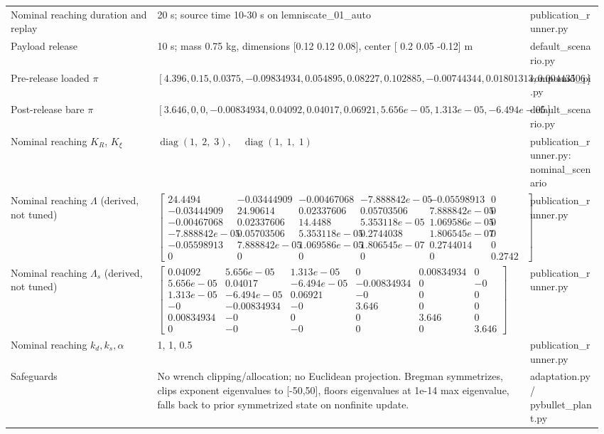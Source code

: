 \begin{table}[t]
\begin{tabular}{p{0.24\linewidth}p{0.61\linewidth}p{0.12\linewidth}}
Nominal reaching duration and replay & 20 s; source time 10-30 s on lemniscate_01_auto & publication_runner.py \\
Payload release & 10 s; mass 0.75 kg, dimensions [0.12 0.12 0.08], center [ 0.2   0.05 -0.12] m & default_scenario.py \\
Pre-release loaded $\pi$ & $[4.396, 0.15, 0.0375, -0.09834934, 0.054895, 0.08227, 0.102885, -0.00744344, 0.01801313, 0.00443506]$ & compound_pi.py \\
Post-release bare $\pi$ & $[3.646, 0, 0, -0.00834934, 0.04092, 0.04017, 0.06921, 5.656e-05, 1.313e-05, -6.494e-05]$ & default_scenario.py \\
Nominal reaching $K_R$, $K_\xi$ & $\operatorname{diag}(1,\;2,\;3),\quad \operatorname{diag}(1,\;1,\;1)$ & publication_runner.py: nominal_scenario \\
Nominal reaching $\Lambda$ (derived, not tuned) & $\begin{bmatrix}24.4494 & -0.03444909 & -0.00467068 & -7.888842e-05 & -0.05598913 & 0 \\-0.03444909 & 24.90614 & 0.02337606 & 0.05703506 & 7.888842e-05 & 0 \\-0.00467068 & 0.02337606 & 14.4488 & 5.353118e-05 & 1.069586e-05 & 0 \\-7.888842e-05 & 0.05703506 & 5.353118e-05 & 0.2744038 & 1.806545e-07 & 0 \\-0.05598913 & 7.888842e-05 & 1.069586e-05 & 1.806545e-07 & 0.2744014 & 0 \\0 & 0 & 0 & 0 & 0 & 0.2742732\end{bmatrix}$ & publication_runner.py \\
Nominal reaching $\Lambda_s$ (derived, not tuned) & $\begin{bmatrix}0.04092 & 5.656e-05 & 1.313e-05 & 0 & 0.00834934 & 0 \\5.656e-05 & 0.04017 & -6.494e-05 & -0.00834934 & 0 & -0 \\1.313e-05 & -6.494e-05 & 0.06921 & -0 & 0 & 0 \\-0 & -0.00834934 & -0 & 3.646 & 0 & 0 \\0.00834934 & -0 & 0 & 0 & 3.646 & 0 \\0 & -0 & -0 & 0 & 0 & 3.646\end{bmatrix}$ & publication_runner.py \\
Nominal reaching $k_d,k_s,\alpha$ & 1, 1, 0.5 & publication_runner.py \\
Safeguards & No wrench clipping/allocation; no Euclidean projection. Bregman symmetrizes, clips exponent eigenvalues to [-50,50], floors eigenvalues at 1e-14 max eigenvalue, falls back to prior symmetrized state on nonfinite update. & adaptation.py / pybullet_plant.py \\
\hline\end{tabular}\end{table}
